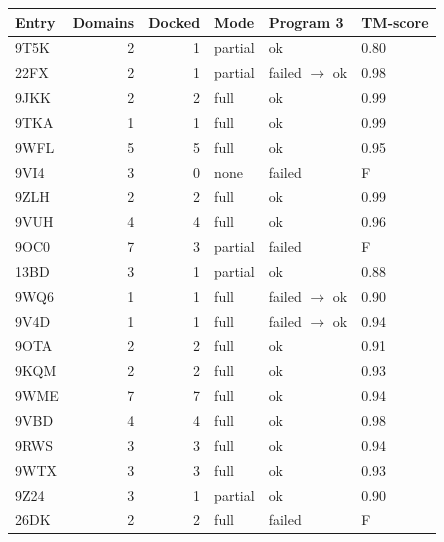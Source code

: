 \begin{tabular}{lrrlll}
\toprule
Entry & Domains & Docked & Mode & Program 3 & TM-score \\
\midrule
9T5K & 2 & 1 & partial & ok & 0.80 \\
22FX & 2 & 1 & partial & failed $\to$ ok & 0.98 \\
9JKK & 2 & 2 & full & ok & 0.99 \\
9TKA & 1 & 1 & full & ok & 0.99 \\
9WFL & 5 & 5 & full & ok & 0.95 \\
9VI4 & 3 & 0 & none & failed & F \\
9ZLH & 2 & 2 & full & ok & 0.99 \\
9VUH & 4 & 4 & full & ok & 0.96 \\
9OC0 & 7 & 3 & partial & failed & F \\
13BD & 3 & 1 & partial & ok & 0.88 \\
9WQ6 & 1 & 1 & full & failed $\to$ ok & 0.90 \\
9V4D & 1 & 1 & full & failed $\to$ ok & 0.94 \\
9OTA & 2 & 2 & full & ok & 0.91 \\
9KQM & 2 & 2 & full & ok & 0.93 \\
9WME & 7 & 7 & full & ok & 0.94 \\
9VBD & 4 & 4 & full & ok & 0.98 \\
9RWS & 3 & 3 & full & ok & 0.94 \\
9WTX & 3 & 3 & full & ok & 0.93 \\
9Z24 & 3 & 1 & partial & ok & 0.90 \\
26DK & 2 & 2 & full & failed & F \\
\bottomrule
\end{tabular}
